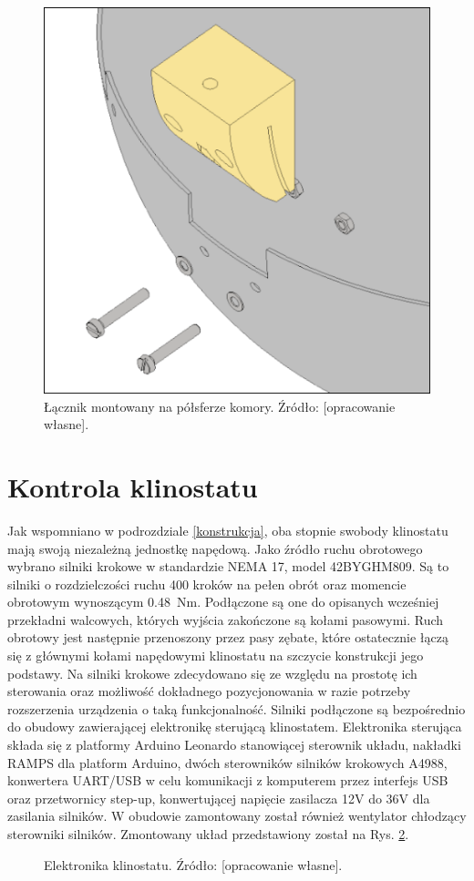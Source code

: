 \begin{figure}
	
	\centering
	\includegraphics[scale=.25]{bottom_half_connector_framed}
	\caption{Łącznik montowany na półsferze komory. Źródło: [opracowanie własne].} 
	\label{fig:łącznik_globus}
	
\end{figure}

\section{Kontrola klinostatu}

Jak wspomniano w podrozdziale \ref{konstrukcja}, oba stopnie swobody klinostatu mają swoją niezależną jednostkę napędową. Jako źródło ruchu obrotowego wybrano silniki krokowe w standardzie NEMA 17, model 42BYGHM809. Są to silniki o rozdzielczości ruchu 400 kroków na pełen obrót oraz momencie obrotowym wynoszącym \SI{0,48}{Nm}. Podłączone są one do opisanych wcześniej przekładni walcowych, których wyjścia zakończone są kołami pasowymi. Ruch obrotowy jest następnie przenoszony przez pasy zębate, które ostatecznie łączą się z głównymi kołami napędowymi klinostatu na szczycie konstrukcji jego podstawy. Na silniki krokowe zdecydowano się ze względu na prostotę ich sterowania oraz możliwość dokładnego pozycjonowania w razie potrzeby rozszerzenia urządzenia o taką funkcjonalność. Silniki podłączone są bezpośrednio do obudowy zawierającej elektronikę sterującą klinostatem. Elektronika sterująca składa się z platformy Arduino Leonardo stanowiącej sterownik układu, nakładki RAMPS dla platform Arduino, dwóch sterowników silników krokowych A4988, konwertera UART/USB w celu komunikacji \linebreak z komputerem przez interfejs USB oraz przetwornicy step-up, konwertującej napięcie zasilacza 12V do 36V dla zasilania silników. W obudowie zamontowany został również wentylator chłodzący sterowniki silników. Zmontowany układ przedstawiony został na Rys. \ref{fig:elektronika}. 

\begin{figure}[ht]
	\centering
	\setlength{\fboxsep}{0pt}
	\setlength{\fboxrule}{1pt}
	\caption{Elektronika klinostatu. Źródło: [opracowanie własne].} 
	\label{fig:elektronika}
\end{figure}